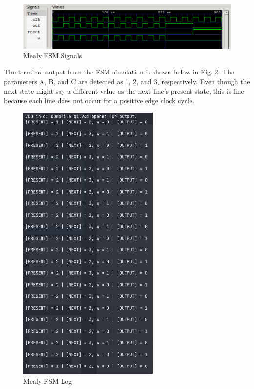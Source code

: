 \documentclass{article}
\begin{document}
\begin{figure}[!ht] 
    \centering
    \includegraphics[width = 15cm]{q1-waves.png}
    \caption{Mealy FSM Signals}
    \label{fig:q1-waves}
\end{figure}

The terminal output from the FSM simulation is shown below in Fig. \ref{fig:q1-output}. The parameters A, B, and C are detected as 1, 2, and 3, respectively. Even though the next state might say a different value as the next line's present state, this is fine because each line does not occur for a positive edge clock cycle. 

\begin{figure}[!ht] 
    \centering
    \includegraphics[width = 7cm]{q1-output.png}
    \caption{Mealy FSM Log}
    \label{fig:q1-output}
\end{figure}

\clearpage %
\end{document}
